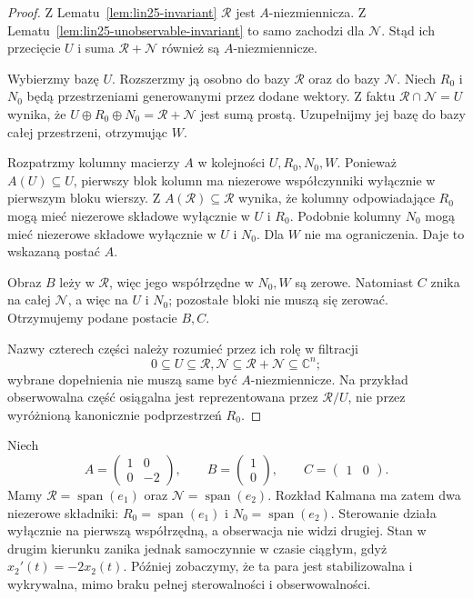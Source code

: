 \begin{proof}
Z Lematu~\ref{lem:lin25-invariant}
\(\mathcal R\) jest
\(A\)-niezmiennicza.
Z
Lematu~\ref{lem:lin25-unobservable-invariant}
to samo zachodzi dla
\(\mathcal N\).
Stąd ich przecięcie
\(U\) i suma
\(\mathcal R+\mathcal N\)
również są \(A\)-niezmiennicze.

Wybierzmy bazę \(U\).
Rozszerzmy ją osobno
do bazy \(\mathcal R\)
oraz do bazy \(\mathcal N\).
Niech \(R_0\) i \(N_0\)
będą przestrzeniami
generowanymi przez dodane
wektory. Z faktu
\(\mathcal R\cap\mathcal N=U\)
wynika, że
\(U\oplus R_0\oplus N_0
 =\mathcal R+\mathcal N\)
jest sumą prostą.
Uzupełnijmy jej bazę
do bazy całej przestrzeni,
otrzymując \(W\).

Rozpatrzmy kolumny
macierzy \(A\)
w kolejności
\(U,R_0,N_0,W\).
Ponieważ \(A(U)\subseteq U\),
pierwszy blok kolumn
ma niezerowe współczynniki
wyłącznie w pierwszym
bloku wierszy.
Z \(A(\mathcal R)\subseteq\mathcal R\)
wynika, że kolumny
odpowiadające \(R_0\)
mogą mieć niezerowe składowe
wyłącznie w \(U\) i \(R_0\).
Podobnie kolumny \(N_0\)
mogą mieć niezerowe składowe
wyłącznie w \(U\) i \(N_0\).
Dla \(W\) nie ma ograniczenia.
Daje to wskazaną postać \(A\).

Obraz \(B\) leży w \(\mathcal R\),
więc jego współrzędne
w \(N_0,W\) są zerowe.
Natomiast \(C\) znika
na całej \(\mathcal N\),
a więc na \(U\) i \(N_0\);
pozostałe bloki nie muszą
się zerować. Otrzymujemy
podane postacie \(B,C\).

Nazwy czterech części
należy rozumieć przez
ich rolę w filtracji
\[
 0\subseteq U
 \subseteq\mathcal R,\mathcal N
 \subseteq\mathcal R+\mathcal N
 \subseteq\mathbb C^n;
\]
wybrane dopełnienia
nie muszą same być
\(A\)-niezmiennicze.
Na przykład obserwowalna
część osiągalna jest
reprezentowana przez
\(\mathcal R/U\),
nie przez wyróżnioną
kanonicznie podprzestrzeń \(R_0\).
\end{proof}

\begin{przyklad}
\label{prz:lin25-reachable-split}
Niech
\[
 A=\begin{pmatrix}1&0\\0&-2\end{pmatrix},
 \qquad B=\begin{pmatrix}1\\0\end{pmatrix},
 \qquad C=\begin{pmatrix}1&0\end{pmatrix}.
\]
Mamy
\(\mathcal R=\operatorname{span}(e_1)\)
oraz
\(\mathcal N=\operatorname{span}(e_2)\).
Rozkład Kalmana ma zatem
dwa niezerowe składniki:
\(R_0=\operatorname{span}(e_1)\)
i \(N_0=\operatorname{span}(e_2)\).
Sterowanie działa wyłącznie
na pierwszą współrzędną,
a obserwacja nie widzi drugiej.
Stan w drugim kierunku
zanika jednak samoczynnie
w czasie ciągłym, gdyż
\(x_2'(t)=-2x_2(t)\).
Później zobaczymy, że
ta para jest stabilizowalna
i wykrywalna, mimo braku
pełnej sterowalności
i obserwowalności.
\end{przyklad}

